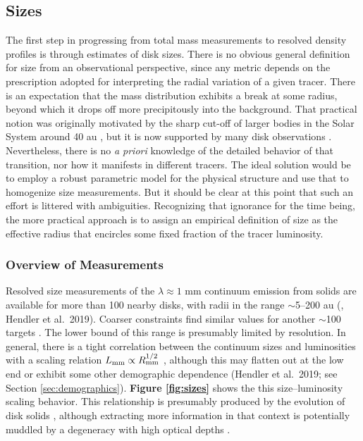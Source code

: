 \documentclass[a4paper]{ar-1col}
\begin{document}



\subsection{Sizes} \label{sec:sizes}

The first step in progressing from total mass measurements to resolved density profiles is through estimates of disk sizes.  There is no obvious general definition for size from an observational perspective, since any metric depends on the prescription adopted for interpreting the radial variation of a given tracer.  There is an expectation that the mass distribution exhibits a break at some radius, beyond which it drops off more precipitously into the background.  That practical notion was originally motivated by the sharp cut-off of larger bodies in the Solar System around 40 au \citep[e.g.,][]{luu02}, but it is now supported by many disk observations \citep[e.g.,][]{andrews18}.  Nevertheless, there is no {\it a priori} knowledge of the detailed behavior of that transition, nor how it manifests in different tracers.  The ideal solution would be to employ a robust parametric model for the physical structure and use that to homogenize size measurements.  But it should be clear at this point that such an effort is littered with ambiguities.  Recognizing that ignorance for the time being, the more practical approach is to assign an empirical definition of size as the effective radius that encircles some fixed fraction of the tracer luminosity. 


\subsubsection{Overview of Measurements}
Resolved size measurements of the $\lambda \approx 1$ mm continuum emission from solids are available for more than 100 nearby disks, with radii in the range $\sim$5--200 au (\citealt{tripathi17,tazzari17,andrews18}, Hendler et al.~2019).  Coarser constraints find similar values for another $\sim$100 targets \citep[e.g.,][]{barenfeld17_sizes,eisner18,cieza19}.  The lower bound of this range is presumably limited by resolution.  In general, there is a tight correlation between the continuum sizes and luminosities \citep{andrews10,pietu14} with a scaling relation $L_{\rm mm} \propto R_{\rm mm}^{1/2}$ \citep{tripathi17,andrews18}, although this may flatten out at the low end or exhibit some other demographic dependence (Hendler et al.~2019; see Section \ref{sec:demographics}).  {\bf Figure \ref{fig:sizes}} shows the this size--luminosity scaling behavior.  This relationship is presumably produced by the evolution of disk solids \citep{tripathi17,rosotti19b}, although extracting more information in that context is potentially muddled by a degeneracy with high optical depths \citep{andrews18,zhu19}.  
\end{document}
